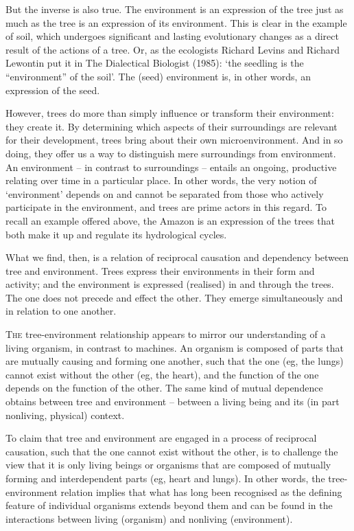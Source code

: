 \documentclass[../main.tex]{subfiles}
\begin{document}
\begin{multicols}{2}
{But the inverse is also true. The environment is an expression of the tree just as much as the tree is an expression of its environment. This is clear in the example of soil, which undergoes significant and lasting evolutionary changes as a direct result of the actions of a tree. Or, as the ecologists Richard Levins and Richard Lewontin put it in The Dialectical Biologist (1985): ‘the seedling is the “environment” of the soil’. The (seed) environment is, in other words, an expression of the seed. 

However, trees do more than simply influence or transform their environment: they create it. By determining which aspects of their surroundings are relevant for their development, trees bring about their own microenvironment. And in so doing, they offer us a way to distinguish mere surroundings from environment. An environment – in contrast to surroundings – entails an ongoing, productive relating over time in a particular place. In other words, the very notion of ‘environment’ depends on and cannot be separated from those who actively participate in the environment, and trees are prime actors in this regard. To recall an example offered above, the Amazon is an expression of the trees that both make it up and regulate its hydrological cycles. 

What we find, then, is a relation of reciprocal causation and dependency between tree and environment. Trees express their environments in their form and activity; and the environment is expressed (realised) in and through the trees. The one does not precede and effect the other. They emerge simultaneously and in relation to one another. 

\lettrine{T}{he} tree-environment relationship appears to mirror our understanding of a living organism, in contrast to machines. An organism is composed of parts that are mutually causing and forming one another, such that the one (eg, the lungs) cannot exist without the other (eg, the heart), and the function of the one depends on the function of the other. The same kind of mutual dependence obtains between tree and environment – between a living being and its (in part nonliving, physical) context. 

To claim that tree and environment are engaged in a process of reciprocal causation, such that the one cannot exist without the other, is to challenge the view that it is only living beings or organisms that are composed of mutually forming and interdependent parts (eg, heart and lungs). In other words, the tree-environment relation implies that what has long been recognised as the defining feature of individual organisms extends beyond them and can be found in the interactions between living (organism) and nonliving (environment). 

}
\end{multicols}
\end{document}

